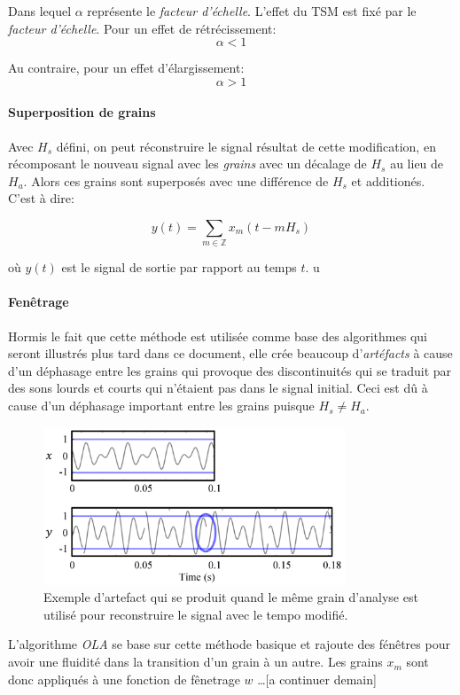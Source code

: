 \documentclass[letterpaper]{article}
\begin{document}
Dans lequel $\alpha$ représente le \emph{facteur d'échelle}.
L'effet du TSM est fixé par le \emph{facteur d'échelle}. Pour un effet de rétrécissement:
$$\alpha < 1$$

Au contraire, pour un effet d'élargissement:
$$\alpha > 1$$

\paragraph{Superposition de grains}

Avec $H_{s}$ défini, on peut réconstruire le signal résultat de cette modification, en récomposant
le nouveau signal avec les \emph{grains} avec un décalage de $H_{s}$ au lieu de $H_{a}$. Alors ces
grains sont superposés avec une différence de $H_{s}$ et additionés. C'est à dire:

$$ y(t) = \sum_{m \in \mathbb{Z}} x_{m}(t-mH_{s})$$

où $y(t)$ est le signal de sortie par rapport au temps $t$.
u
\paragraph {Fenêtrage}

Hormis le fait que cette méthode est utilisée comme base des algorithmes qui seront illustrés plus
tard dans ce document, elle crée beaucoup d'\emph{artéfacts} à cause d'un déphasage entre les
grains qui provoque des discontinuités qui se traduit par des sons lourds et courts qui n'étaient pas
dans le signal initial. Ceci est dû à cause d'un déphasage important entre les grains
puisque $H_{s} \neq H_{a}$.

\begin{figure}[h]
    \centerline{\includegraphics[width=9cm]{res/artifact.png}}
    \caption{\label{fig:artifact}Exemple d'artefact qui se produit quand le même grain d'analyse est
      utilisé pour reconstruire le signal avec le tempo modifié. \cite{TSMreview} }
  \end{figure}
  
L'algorithme \emph{OLA} se base sur cette méthode basique et rajoute des fénêtres pour avoir une
fluidité dans la transition d'un grain à un autre. Les grains $x_m$ sont donc appliqués à une fonction
de fênetrage $w$ \dots [a continuer demain]
\end{document}
